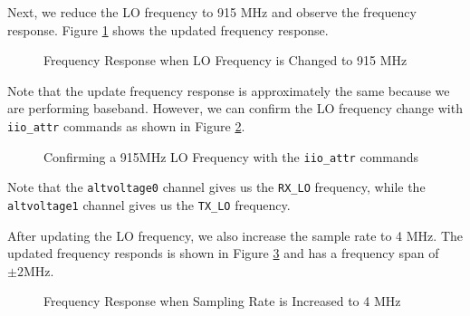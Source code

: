 \documentclass{article}
\begin{document}
Next, we reduce the LO frequency to 915 MHz and observe the frequency response. 
Figure \ref{fig::gnu_radio_loopback_generic_iio_915_MHz_lo} shows the updated frequency response.

\begin{figure}[H]
	\centerline{}
	\caption{Frequency Response when LO Frequency is Changed to 915 MHz}
	\label{fig::gnu_radio_loopback_generic_iio_915_MHz_lo}
\end{figure}

Note that the update frequency response is approximately the same because we are performing baseband. However, we can confirm the LO frequency change with \texttt{iio\_attr} commands as shown in Figure \ref{fig::iio_attr_confirm_lo_frequency}.

\begin{figure}[H]
	\centerline{}
	\caption{Confirming a 915MHz LO Frequency with the \texttt{iio\_attr} commands}
	\label{fig::iio_attr_confirm_lo_frequency}
\end{figure}

Note that the \texttt{altvoltage0} channel gives us the \texttt{RX\_LO} frequency, while the \texttt{altvoltage1} channel gives us the \texttt{TX\_LO} frequency.

After updating the LO frequency, we also increase the sample rate to 4 MHz. The updated frequency responds is shown in Figure \ref{fig::gnu_radio_loopback_generic_iio_4MSPS} and has a frequency span of $\pm 2 \text{MHz}$.

\begin{figure}[H]
	\centerline{}
	\caption{Frequency Response when Sampling Rate is Increased to 4 MHz}
	\label{fig::gnu_radio_loopback_generic_iio_4MSPS}
\end{figure}
\end{document}
